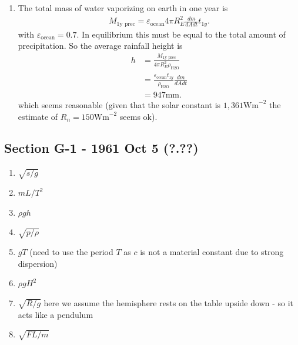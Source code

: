 \documentclass[10pt,a4paper]{book}
\theoremstyle{definition}
\begin{document}
\begin{enumerate}[label=(\alph*)]
\item The total mass of water vaporizing on earth in one year is
\begin{align}
    M_\text{1y prec}=\varepsilon_\text{ocean} 4\pi R_E^2  \frac{dm}{dA dt} t_{1y}.
\end{align}
with $\varepsilon_\text{ocean}=0.7$. In equilibrium this must be equal to the total amount of precipitation. So the average rainfall height is 
\begin{align}
    h&=\frac{M_\text{1y prec}}{4\pi R_E^2\rho_\text{H2O}}\\
    &=\frac{\varepsilon_\text{ocean}t_{1y}}{\rho_\text{H2O}} \frac{dm}{dA dt}\\
    &=947\text{mm}.
\end{align}
which seems reasonable (given that the solar constant is $1,361\text{Wm}^{-2}$ the estimate of $R_n=150\text{Wm}^{-2}$ seems ok).
\end{enumerate}

\subsection{Section G-1 - 1961 Oct 5 (?.??)}
\begin{enumerate}[label=(\alph*)]
    \item $\sqrt{s/g}$
    \item $mL/T^2$
    \item $\rho g h$
    \item $\sqrt{p/\rho}$
    \item $gT$ (need to use the period $T$ as $c$ is not a material constant due to strong dispersion)
    \item $\rho g H^2$
    \item $\sqrt{R/g}$ here we assume the hemisphere rests on the table upside down - so it acts like a pendulum 
    \item $\sqrt{FL/m}$
\end{enumerate}
\end{document}
